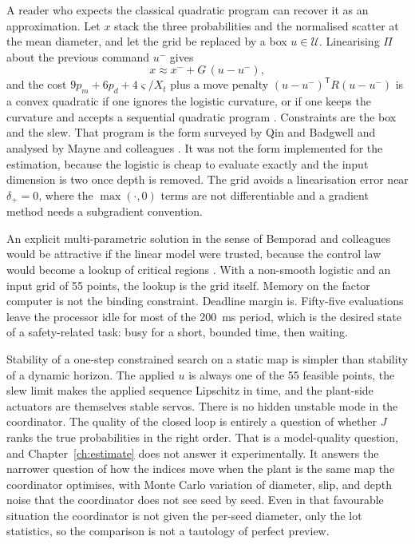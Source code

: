 A reader who expects the classical quadratic program can recover it as an approximation. Let $x$ stack the three probabilities and the normalised scatter at the mean diameter, and let the grid be replaced by a box $u\in\mathcal U$. Linearising $\Pi$ about the previous command $u^{-}$ gives
\begin{equation}
x \approx x^{-} + G\,(u-u^{-}),
\label{eq:lin}
\end{equation}
and the cost $9p_m+6p_d+4\varsigma/X_t$ plus a move penalty $(u-u^{-})^{\mathsf T} R (u-u^{-})$ is a convex quadratic if one ignores the logistic curvature, or if one keeps the curvature and accepts a sequential quadratic program \cite{nocedal2006,boyd2004}. Constraints are the box and the slew. That program is the form surveyed by Qin and Badgwell and analysed by Mayne and colleagues \cite{qin2003,mayne2000}. It was not the form implemented for the estimation, because the logistic is cheap to evaluate exactly and the input dimension is two once depth is removed. The grid avoids a linearisation error near $\delta_{+}=0$, where the $\max(\cdot,0)$ terms are not differentiable and a gradient method needs a subgradient convention.

An explicit multi-parametric solution in the sense of Bemporad and colleagues would be attractive if the linear model were trusted, because the control law would become a lookup of critical regions \cite{bemporad2002}. With a non-smooth logistic and an input grid of 55 points, the lookup is the grid itself. Memory on the factor computer is not the binding constraint. Deadline margin is. Fifty-five evaluations leave the processor idle for most of the 200~ms period, which is the desired state of a safety-related task: busy for a short, bounded time, then waiting.

Stability of a one-step constrained search on a static map is simpler than stability of a dynamic horizon. The applied $u$ is always one of the 55 feasible points, the slew limit makes the applied sequence Lipschitz in time, and the plant-side actuators are themselves stable servos. There is no hidden unstable mode in the coordinator. The quality of the closed loop is entirely a question of whether $J$ ranks the true probabilities in the right order. That is a model-quality question, and Chapter~\ref{ch:estimate} does not answer it experimentally. It answers the narrower question of how the indices move when the plant is the same map the coordinator optimises, with Monte Carlo variation of diameter, slip, and depth noise that the coordinator does not see seed by seed. Even in that favourable situation the coordinator is not given the per-seed diameter, only the lot statistics, so the comparison is not a tautology of perfect preview.

